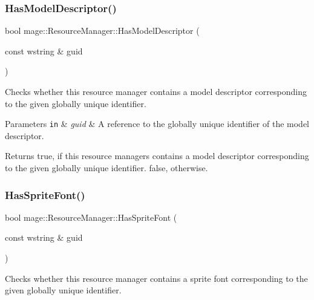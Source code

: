 \subsubsection{\texorpdfstring{Has\+Model\+Descriptor()}{HasModelDescriptor()}}
{\footnotesize\ttfamily bool mage\+::\+Resource\+Manager\+::\+Has\+Model\+Descriptor (\begin{DoxyParamCaption}\item[{const wstring \&}]{guid }\end{DoxyParamCaption})\hspace{0.3cm}{\ttfamily [noexcept]}}

Checks whether this resource manager contains a model descriptor corresponding to the given globally unique identifier.


\begin{DoxyParams}[1]{Parameters}
\mbox{\tt in}  & {\em guid} & A reference to the globally unique identifier of the model descriptor. \\
\hline
\end{DoxyParams}
\begin{DoxyReturn}{Returns}
{\ttfamily true}, if this resource managers contains a model descriptor corresponding to the given globally unique identifier. {\ttfamily false}, otherwise. 
\end{DoxyReturn}
\hypertarget{classmage_1_1_resource_manager_a505a5b25923d88020d85a2f3307e4b7f}{}\label{classmage_1_1_resource_manager_a505a5b25923d88020d85a2f3307e4b7f} 
\subsubsection{\texorpdfstring{Has\+Sprite\+Font()}{HasSpriteFont()}}
{\footnotesize\ttfamily bool mage\+::\+Resource\+Manager\+::\+Has\+Sprite\+Font (\begin{DoxyParamCaption}\item[{const wstring \&}]{guid }\end{DoxyParamCaption})\hspace{0.3cm}{\ttfamily [noexcept]}}

Checks whether this resource manager contains a sprite font corresponding to the given globally unique identifier.


